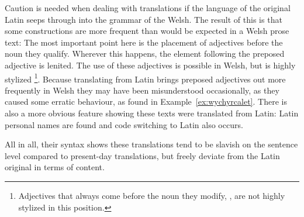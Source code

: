 Caution is needed when dealing with translations if the language of the original Latin seeps through into the grammar of the Welsh.
The result of this is that some constructions are more frequent than would be expected in a Welsh prose text:
The most important point here is the placement of adjectives before the noun they qualify.
Wherever this happens, the element following the preposed adjective is lenited.
The use of these adjectives is possible in Welsh, but is highly stylized%
\footnote{Adjectives that always come before the noun they modify, \eg {}, are not highly stylized in this position.}.
Because translating from Latin brings preposed adjectives out more frequently in Welsh they may have been misunderstood occasionally, as they caused some erratic behaviour, as found in Example~\ref{ex:wychyrcalet}.
There is also a more obvious feature showing these texts were translated from Latin: Latin personal names are found and code switching to Latin also occurs.  

All in all, their syntax shows these translations tend to be slavish on the sentence level compared to present-day translations, but freely deviate from the Latin original in terms of content. 





